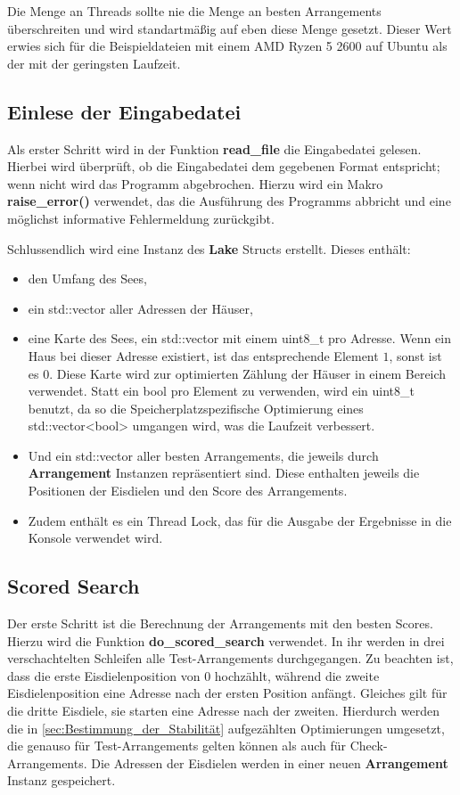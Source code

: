 \documentclass[a4paper,10pt,ngerman,captions=figureheading]{scrartcl}
\begin{document}
Die Menge an Threads sollte nie die Menge an besten Arrangements überschreiten und wird standartmäßig auf eben diese Menge gesetzt.
Dieser Wert erwies sich für die Beispieldateien mit einem AMD Ryzen 5 2600 auf Ubuntu als der mit der geringsten Laufzeit.

\subsection{Einlese der Eingabedatei}
\label{sec:Einlese_der_Eingabedatei}
Als erster Schritt wird in der Funktion \textbf{read\_file} die Eingabedatei gelesen.
Hierbei wird überprüft, ob die Eingabedatei dem gegebenen Format entspricht; wenn nicht wird das Programm abgebrochen.
Hierzu wird ein Makro \textbf{raise\_error()} verwendet, das die Ausführung des Programms abbricht und eine möglichst informative Fehlermeldung zurückgibt.

Schlussendlich wird eine Instanz des \textbf{Lake} Structs erstellt.
Dieses enthält:
\begin{itemize}
    \item den Umfang des Sees,
    \item ein std::vector aller Adressen der Häuser,
    \item eine Karte des Sees, ein std::vector mit einem uint8\_t pro Adresse.
          Wenn ein Haus bei dieser Adresse existiert, ist das entsprechende Element $1$, sonst ist es $0$.
          Diese Karte wird zur optimierten Zählung der Häuser in einem Bereich verwendet.
          Statt ein bool pro Element zu verwenden, wird ein uint8\_t benutzt, da so die Speicherplatzspezifische Optimierung eines std::vector<bool> umgangen wird, was die Laufzeit verbessert.
    \item Und ein std::vector aller besten Arrangements, die jeweils durch \textbf{Arrangement} Instanzen repräsentiert sind.
          Diese enthalten jeweils die Positionen der Eisdielen und den Score des Arrangements.
    \item Zudem enthält es ein Thread Lock, das für die Ausgabe der Ergebnisse in die Konsole verwendet wird.
\end{itemize}

\subsection{Scored Search}
\label{sec:Scored_Search}
Der erste Schritt ist die Berechnung der Arrangements mit den besten Scores.
Hierzu wird die Funktion \textbf{do\_scored\_search} verwendet.
In ihr werden in drei verschachtelten Schleifen alle Test-Arrangements durchgegangen.
Zu beachten ist, dass die erste Eisdielenposition von $0$ hochzählt, während die zweite Eisdielenposition eine Adresse nach der ersten Position anfängt.
Gleiches gilt für die dritte Eisdiele, sie starten eine Adresse nach der zweiten.
Hierdurch werden die in \autoref{sec:Bestimmung_der_Stabilität} aufgezählten Optimierungen umgesetzt, die genauso für Test-Arrangements gelten können als auch für Check-Arrangements.
Die Adressen der Eisdielen werden in einer neuen \textbf{Arrangement} Instanz gespeichert.
\end{document}
